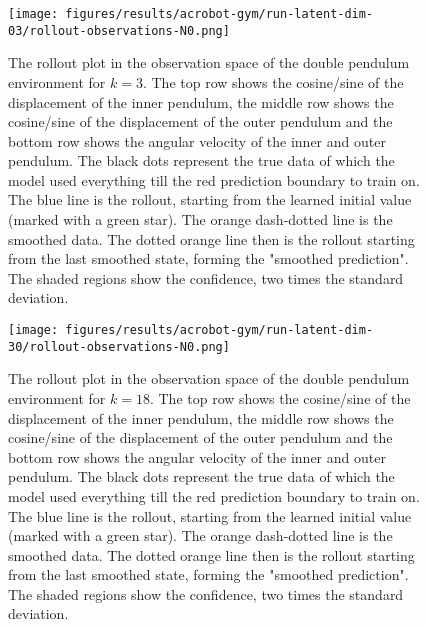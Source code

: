 		\begin{figure}
			\centering
			\texttt{[image: figures/results/acrobot-gym/run-latent-dim-03/rollout-observations-N0.png]}
			\caption[Rollout of the double pendulum experiment for 3 latent dimensions]{The rollout plot in the observation space of the double pendulum environment for \(k = 3\). The top row shows the cosine/sine of the displacement of the inner pendulum, the middle row shows the cosine/sine of the displacement of the outer pendulum and the bottom row shows the angular velocity of the inner and outer pendulum. The black dots represent the true data of which the model used everything till the red prediction boundary to train on. The blue line is the rollout, starting from the learned initial value (marked with a green star). The orange dash-dotted line is the smoothed data. The dotted orange line then is the rollout starting from the last smoothed state, forming the "smoothed prediction". The shaded regions show the confidence, \ie two times the standard deviation.}
			\label{fig:acrobotRolloutL03}
		\end{figure}

		\begin{figure}
			\centering
			\texttt{[image: figures/results/acrobot-gym/run-latent-dim-30/rollout-observations-N0.png]}
			\caption[Rollout of the double pendulum experiment for 30 latent dimensions]{The rollout plot in the observation space of the double pendulum environment for \(k = 18\). The top row shows the cosine/sine of the displacement of the inner pendulum, the middle row shows the cosine/sine of the displacement of the outer pendulum and the bottom row shows the angular velocity of the inner and outer pendulum. The black dots represent the true data of which the model used everything till the red prediction boundary to train on. The blue line is the rollout, starting from the learned initial value (marked with a green star). The orange dash-dotted line is the smoothed data. The dotted orange line then is the rollout starting from the last smoothed state, forming the "smoothed prediction". The shaded regions show the confidence, \ie two times the standard deviation.}
			\label{fig:acrobotRolloutL30}
		\end{figure}
